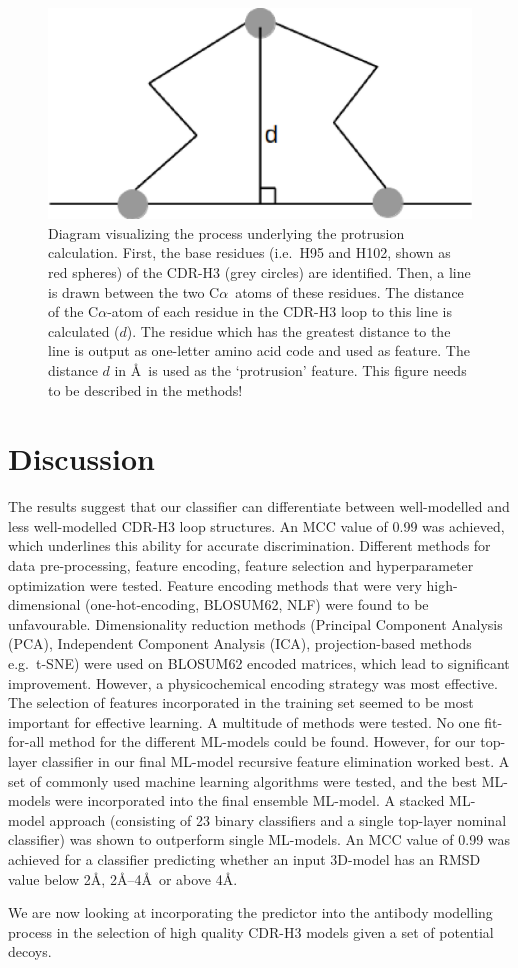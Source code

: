 \documentclass[12pt]{article}
\newcommand{\ca}{\mbox{C$\alpha$}}
\newcommand{\lilian}[1]{ {\color{red}{\bfseries Lilian:} #1}}
\begin{document}
\begin{figure}
  \centering
  \includegraphics[scale=0.5]{protrusion.eps}
  \caption {Diagram
    visualizing the process underlying the protrusion
    calculation. First, the base residues (i.e.\ H95 and H102, shown as
    red spheres) of the CDR-H3 (grey circles) are identified. Then, a
    line is drawn between the two \ca\ atoms of these residues.
    The distance of the \ca-atom of each residue in the
    CDR-H3 loop to this line is calculated ($d$). The residue which has the
    greatest distance to the line is output
    as one-letter amino acid code and used as feature. The distance $d$ in
    \AA\ is used as the `protrusion'
    feature. \lilian{This figure needs to be described in the methods!}}
  \label{fig:loopdist}
\end{figure}




\section{Discussion}
The results suggest that our classifier can differentiate
between well-modelled and less well-modelled CDR-H3 loop
structures. An MCC value of 0.99 was achieved, which underlines this
ability for accurate discrimination. Different methods for data
pre-processing, feature encoding, feature selection and hyperparameter
optimization were tested.
Feature encoding methods that were very high-dimensional
(one-hot-encoding, BLOSUM62, NLF) were found to be
unfavourable. Dimensionality reduction methods (Principal Component
Analysis (PCA), Independent Component Analysis (ICA), projection-based
methods e.g.\ t-SNE) were used on BLOSUM62 encoded matrices, which lead
to significant improvement. However, a physicochemical encoding
strategy was most effective.
The selection of features incorporated in the training set seemed to
be most important for effective learning. A multitude of methods were
tested. No one fit-for-all method for the different ML-models could be
found. However, for our top-layer classifier in our final ML-model
recursive feature elimination worked best.
A set of commonly used machine learning algorithms were tested, and
the best ML-models were incorporated into the final ensemble ML-model. A
stacked ML-model approach (consisting of 23 binary classifiers and a
single top-layer nominal classifier) was shown to outperform single
ML-models.
An MCC value of 0.99 was achieved for a classifier predicting whether
an input 3D-model has an RMSD value below 2\AA, 2\AA--4\AA\ or above
4\AA.

We are now looking at incorporating the predictor into the antibody
modelling process in the selection of high quality CDR-H3 models given
a set of potential decoys.



\end{document}
